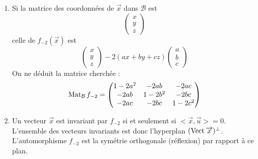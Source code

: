 \begin{enumerate}
\begin{enumerate}
\item Si la matrice des coordonnées de $\overrightarrow x$ dans $\mathcal B$ est 
\begin{displaymath}
 \begin{pmatrix}
  x \\ y \\ z
 \end{pmatrix}
\end{displaymath}
celle de $f_{-2}(\overrightarrow x)$ est 
\begin{displaymath}
 \begin{pmatrix}
  x \\ y \\ z
 \end{pmatrix} 
-2(ax+by+cz)
\begin{pmatrix}
  a \\ b \\ c
 \end{pmatrix}
\end{displaymath}
On ne déduit la matrice cherchée :
\begin{displaymath}
 \operatorname{Mat}_{\mathcal B}f_{-2}=
\begin{pmatrix}
 1-2a^2 & -2ab & -2ac \\
-2ab & 1-2b^2 & -2bc \\
-2ac & -2bc &1-2c^2
\end{pmatrix}
\end{displaymath}
\item Un vecteur $\overrightarrow x$ est invariant par $f_{-2}$ si et seulement si $<\overrightarrow x , \overrightarrow u>=0$. L'ensemble des vecteurs invariants est donc l'hyperplan $(\operatorname{Vect} \overrightarrow x)^\perp$. L'automorphisme $f_{-2}$ est la symétrie orthogonale (réflexion) par rapport à ce plan.
\end{enumerate}
\end{enumerate}

